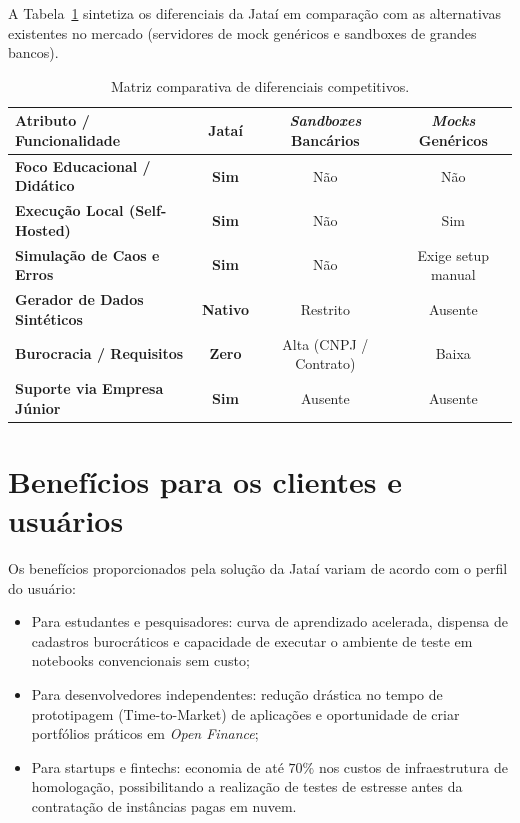 \documentclass[
  12pt,
  openright,
  oneside,
  a4paper,
  brazilian
]{abntex2}
\newcommand{\openfinance}{\textit{Open Finance}}
\begin{document}
A Tabela~\ref{tab:diferenciais_jatai} sintetiza os diferenciais da Jataí em comparação com as alternativas existentes no mercado (servidores de mock genéricos e sandboxes de grandes bancos).

\begin{table}[htbp]
\centering
\caption{Matriz comparativa de diferenciais competitivos.}
\label{tab:diferenciais_jatai}
\begin{tabular}{|p{4.5cm}|c|c|c|}
\hline
\textbf{Atributo / Funcionalidade} & \textbf{Jataí} & \textbf{\textit{Sandboxes} Bancários} & \textbf{\textit{Mocks} Genéricos} \\ \hline
\textbf{Foco Educacional / Didático} & \textbf{Sim} & Não & Não \\ \hline
\textbf{Execução Local (Self-Hosted)} & \textbf{Sim} & Não & Sim \\ \hline
\textbf{Simulação de Caos e Erros} & \textbf{Sim} & Não & Exige setup manual \\ \hline
\textbf{Gerador de Dados Sintéticos} & \textbf{Nativo} & Restrito & Ausente \\ \hline
\textbf{Burocracia / Requisitos} & \textbf{Zero} & Alta (CNPJ / Contrato) & Baixa \\ \hline
\textbf{Suporte via Empresa Júnior} & \textbf{Sim} & Ausente & Ausente \\ \hline
\end{tabular}
\end{table}

\section{Benefícios para os clientes e usuários}
\label{sec:beneficios_clientes}

Os benefícios proporcionados pela solução da Jataí variam de acordo com o perfil do usuário:

\begin{itemize}
    \item{Para estudantes e pesquisadores:} curva de aprendizado acelerada, dispensa de cadastros burocráticos e capacidade de executar o ambiente de teste em notebooks convencionais sem custo;
    \item{Para desenvolvedores independentes:} redução drástica no tempo de prototipagem (Time-to-Market) de aplicações e oportunidade de criar portfólios práticos em \openfinance{};
    \item{Para startups e fintechs:} economia de até $70\%$ nos custos de infraestrutura de homologação, possibilitando a realização de testes de estresse antes da contratação de instâncias pagas em nuvem.
\end{itemize}
\end{document}
